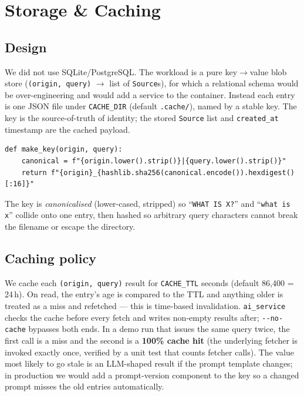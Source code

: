 \documentclass[11pt,a4paper]{article}
\begin{document}
\section{Storage \& Caching}\label{sec:storage}

\subsection{Design}

We did not use SQLite/PostgreSQL. The workload is a pure key$\rightarrow$value blob store
(\texttt{(origin, query)} $\rightarrow$ list of \texttt{Source}s), for which a relational
schema would be over-engineering and would add a service to the container. Instead each entry
is one JSON file under \texttt{CACHE\_DIR} (default \texttt{.cache/}), named by a stable key.
The key is the source-of-truth of identity; the stored \texttt{Source} list and
\texttt{created\_at} timestamp are the cached payload.

\begin{lstlisting}[style=python]
def make_key(origin, query):
    canonical = f"{origin.lower().strip()}|{query.lower().strip()}"
    return f"{origin}_{hashlib.sha256(canonical.encode()).hexdigest()[:16]}"
\end{lstlisting}

The key is \emph{canonicalised} (lower-cased, stripped) so ``\texttt{WHAT IS X?}'' and
``\texttt{what is x}'' collide onto one entry, then hashed so arbitrary query characters
cannot break the filename or escape the directory.

\subsection{Caching policy}

We cache each \texttt{(origin, query)} result for \texttt{CACHE\_TTL} seconds (default 86{,}400
= 24\,h). On read, the entry's age is compared to the TTL and anything older is treated as a
miss and refetched --- this is time-based invalidation. \texttt{ai\_service} checks the cache
before every fetch and writes non-empty results after; \texttt{-{}-no-cache} bypasses both ends.
In a demo run that issues the same query twice, the first call is a miss and the second is a
\textbf{100\% cache hit} (the underlying fetcher is invoked exactly once, verified by a unit
test that counts fetcher calls). The value most likely to go stale is an LLM-shaped result if
the prompt template changes; in production we would add a prompt-version component to the key
so a changed prompt misses the old entries automatically.
\end{document}
